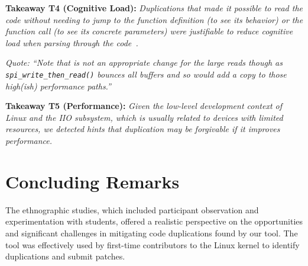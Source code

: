 \documentclass[10pt,conference]{IEEEtran}
\newenvironment{takeaway}[1]{%
  \begin{tcolorbox}
  \textbf{#1:} \itshape}{\end{tcolorbox}}
\begin{document}
%
\begin{takeaway}{Takeaway T4 (Cognitive Load)}
  Duplications that made it possible to read the code without needing to jump
  to the function definition (to see its behavior) or the function call (to see
  its concrete parameters) were justifiable to reduce cognitive load when
  parsing through the code~\cite{skylines-cognitive-load}.
\end{takeaway}

\noindent
\begin{footnotesize}
\textit{
    Quote: ``Note that is not an appropriate change for the large reads though
    as \texttt{spi\_write\_then\_read()} bounces all buffers and so would add a
    copy to those high(ish) performance paths.''
  }
\end{footnotesize}

\begin{takeaway}{Takeaway T5 (Performance)}
  Given the low-level development context of Linux and the IIO subsystem, which
  is usually related to devices with limited resources, we detected hints that
  duplication may be forgivable if it improves performance.
\end{takeaway}

\section{Concluding Remarks}

The ethnographic studies, which included participant observation and experimentation with students, offered a realistic perspective on the opportunities and significant challenges in mitigating code duplications found by our tool. The tool was effectively used by first-time contributors to the Linux kernel to identify duplications and submit patches.
\end{document}
